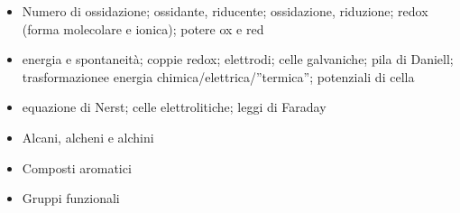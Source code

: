 \documentclass[letterpaper,10pt,english]{jupyterBook}
\begin{document}
\sphinxAtStartPar
{}
\begin{itemize}
\item {} 
\sphinxAtStartPar
Numero di ossidazione; ossidante, riducente; ossidazione, riduzione; redox (forma molecolare e ionica); potere ox e red

\item {} 
\sphinxAtStartPar
energia e spontaneità; coppie redox; elettrodi; celle galvaniche; pila di Daniell; trasformazionee energia chimica/elettrica/”termica”; potenziali di cella

\item {} 
\sphinxAtStartPar
equazione di Nerst; celle elettrolitiche; leggi di Faraday

\end{itemize}

\sphinxAtStartPar
{}
\begin{itemize}
\item {} 
\sphinxAtStartPar
Alcani, alcheni e alchini

\item {} 
\sphinxAtStartPar
Composti aromatici

\item {} 
\sphinxAtStartPar
Gruppi funzionali

\end{itemize}







\renewcommand{\indexname}{Index}
\printindex
\end{document}
